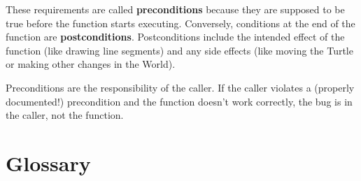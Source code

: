 \documentclass[10pt]{book}
\begin{document}
These requirements are called {\bf preconditions} because they
are supposed to be true before the function starts executing.
Conversely, conditions at the end of the function are
{\bf postconditions}.  Postconditions include the intended
effect of the function (like drawing line segments) and any
side effects (like moving the Turtle or making other changes
in the World).

Preconditions are the responsibility of the caller.  If the caller
violates a (properly documented!) precondition and the function
doesn't work correctly, the bug is in the caller, not the function.



\section{Glossary}
\end{document}

